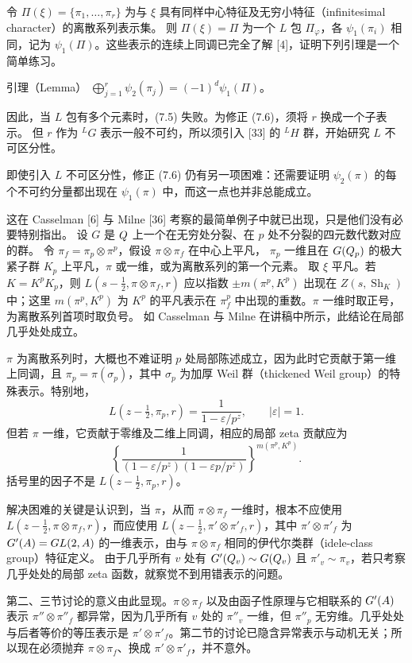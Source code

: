 令 $\Pi(\xi)=\{\pi_1,\ldots,\pi_r\}$ 为与 $\xi$ 具有同样中心特征及无穷小特征（infinitesimal character）的离散系列表示集。
则 $\Pi(\xi)=\Pi$ 为一个 $L$ 包 $\Pi_\varphi$，各 $\psi_1(\pi_i)$ 相同，记为
$\psi_1(\Pi)$。这些表示的连续上同调已完全了解 [4]，证明下列引理是一个简单练习。
\begin{originaltheorem}{引理（Lemma）}
$\displaystyle\bigoplus_{j=1}^r\psi_2(\pi_j)=(-1)^d\psi_1(\Pi)$。
\end{originaltheorem}
因此，当 $L$ 包有多个元素时，(7.5) 失败。为修正 (7.6)，须将 $r$ 换成一个子表示。
但 $r$ 作为 ${}^LG$ 表示一般不可约，所以须引入 [33] 的 ${}^LH$ 群，开始研究
$L$ 不可区分性。

即使引入 $L$ 不可区分性，修正 (7.6) 仍有另一项困难：还需要证明 $\psi_2(\pi)$ 的每个不可约分量都出现在 $\psi_1(\pi)$ 中，而这一点也并非总能成立。

这在 Casselman [6] 与 Milne [36] 考察的最简单例子中就已出现，只是他们没有必要特别指出。
设 $G$ 是 $Q$ 上一个在无穷处分裂、在 $p$ 处不分裂的四元数代数对应的群。
令 $\pi_f=\pi_p\otimes\pi^p$，假设 $\pi\otimes\pi_f$ 在中心上平凡，
$\pi_p$ 一维且在 $G(Q_p)$ 的极大紧子群 $K_p$ 上平凡，$\pi$ 或一维，或为离散系列的第一个元素。
取 $\xi$ 平凡。若 $K=K^pK_p$，则 $L(s-\tfrac12,\pi\otimes\pi_f,r)$ 应以指数
$\pm m(\pi^p,K^p)$ 出现在 $Z(s,\operatorname{Sh}_K)$ 中；这里
$m(\pi^p,K^p)$ 为 $K^p$ 的平凡表示在 $\pi_f^p$ 中出现的重数。$\pi$ 一维时取正号，为离散系列首项时取负号。
如 Casselman 与 Milne 在讲稿中所示，此结论在局部几乎处处成立。

$\pi$ 为离散系列时，大概也不难证明 $p$ 处局部陈述成立，因为此时它贡献于第一维上同调，且
$\pi_p=\pi(\sigma_p)$，其中 $\sigma_p$ 为加厚 Weil 群（thickened Weil group）的特殊表示。特别地，
\[
L(z-\tfrac12,\pi_p,r)=\frac1{1-\varepsilon/p^z},\qquad|\varepsilon|=1.
\]
但若 $\pi$ 一维，它贡献于零维及二维上同调，相应的局部 zeta 贡献应为
\[
\left\{\frac1{(1-\varepsilon/p^z)(1-\varepsilon p/p^z)}\right\}^{m(\pi^p,K^p)}.
\]
括号里的因子不是 $L(z-\tfrac12,\pi_p,r)$。

解决困难的关键是认识到，当 $\pi$，从而 $\pi\otimes\pi_f$ 一维时，根本不应使用
$L(z-\tfrac12,\pi\otimes\pi_f,r)$，而应使用
$L(z-\tfrac12,\pi'\otimes\pi'_f,r)$，其中 $\pi'\otimes\pi'_f$ 为
$G'(A)=GL(2,A)$ 的一维表示，由与 $\pi\otimes\pi_f$ 相同的伊代尔类群（idele-class group）特征定义。
由于几乎所有 $v$ 处有 $G'(Q_v)\sim G(Q_v)$ 且 $\pi'_v\sim\pi_v$，若只考察几乎处处的局部 zeta 函数，就察觉不到用错表示的问题。

第二、三节讨论的意义由此显现。$\pi\otimes\pi_f$ 以及由函子性原理与它相联系的
$G'(A)$ 表示 $\pi''\otimes\pi''_f$ 都异常，因为几乎所有 $v$ 处的
$\pi''_v$ 一维，但 $\pi''_p$ 无穷维。几乎处处与后者等价的等压表示是
$\pi'\otimes\pi'_f$。第二节的讨论已隐含异常表示与动机无关；所以现在必须抛弃
$\pi\otimes\pi_f$、换成 $\pi'\otimes\pi'_f$，并不意外。

